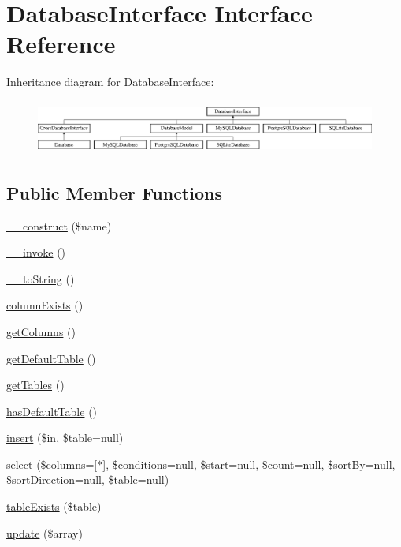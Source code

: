 \hypertarget{interface_database_interface}{}\section{Database\+Interface Interface Reference}
\label{interface_database_interface}
Inheritance diagram for Database\+Interface\+:\begin{figure}[H]
\begin{center}
\leavevmode
\includegraphics[height=1.794872cm]{interface_database_interface}
\end{center}
\end{figure}
\subsection*{Public Member Functions}
\begin{DoxyCompactItemize}
\item 
\hyperlink{interface_database_interface_a4717bbfc70a40a57ee741ed70766c309}{\+\_\+\+\_\+construct} (\$name)
\item 
\hyperlink{interface_database_interface_a9aac7e1475efe923de4e19cc2511f092}{\+\_\+\+\_\+invoke} ()
\item 
\hyperlink{interface_database_interface_a7516ca30af0db3cdbf9a7739b48ce91d}{\+\_\+\+\_\+to\+String} ()
\item 
\hyperlink{interface_database_interface_a0205d4089913613e23189c60d7fdf89a}{column\+Exists} ()
\item 
\hyperlink{interface_database_interface_a6287262cb9628d7a89d8fc16dcb51177}{get\+Columns} ()
\item 
\hyperlink{interface_database_interface_af54c3eed64c3e3dfb06a2541289ff0da}{get\+Default\+Table} ()
\item 
\hyperlink{interface_database_interface_a61b9097ace78236a1a7f9cfd9e9ab01c}{get\+Tables} ()
\item 
\hyperlink{interface_database_interface_ad0aa1804fc79c22b46596db136320017}{has\+Default\+Table} ()
\item 
\hyperlink{interface_database_interface_a8e5626f114925dee9986c8edbfc3ec05}{insert} (\$in, \$table=null)
\item 
\hyperlink{interface_database_interface_a1efc6b974510d4c668660f1abe184182}{select} (\$columns=\mbox{[}\textquotesingle{}$\ast$\textquotesingle{}\mbox{]}, \$conditions=null, \$start=null, \$count=null, \$sort\+By=null, \$sort\+Direction=null, \$table=null)
\item 
\hyperlink{interface_database_interface_ae7cdaa744d52a1eb0103e377023ca528}{table\+Exists} (\$table)
\item 
\hyperlink{interface_database_interface_a3211e273c3ee674b966bab63d966c4b2}{update} (\$array)
\end{DoxyCompactItemize}



